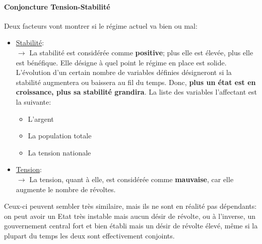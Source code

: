 \documentclass{article}
\begin{document}
                \paragraph{Conjoncture Tension-Stabilité}
                    Deux facteurs vont montrer si le régime actuel va bien ou mal:
                        \begin{itemize}
                            \item \underline{Stabilité}:\\
                                $\rightarrow$ La stabilité est considérée comme \textbf{positive}; plus elle est élevée, plus elle est bénéfique. Elle désigne à quel point le régime en place est solide. L'évolution d'un certain nombre de variables définies désigneront si la stabilité augmentera ou baissera au fil du temps. Donc, \textbf{plus un état est en croissance, plus sa stabilité grandira}. La liste des variables l'affectant est la suivante:
                                    \begin{itemize}
                                        \item L'argent
                                        \item La population totale
                                        \item La tension nationale
                                    \end{itemize}
                            \item \underline{Tension}:\\
                                $\rightarrow$ La tension, quant à elle, est considérée comme \textbf{mauvaise}, car elle augmente le nombre de révoltes.\\
                        \end{itemize}
                    Ceux-ci peuvent sembler très similaire, mais ils ne sont en réalité pas dépendants: on peut avoir un Etat très instable mais aucun désir de révolte, ou à l'inverse, un gouvernement central fort et bien établi mais un désir de révolte élevé, même si la plupart du temps les deux sont effectivement conjoints.
\end{document}
